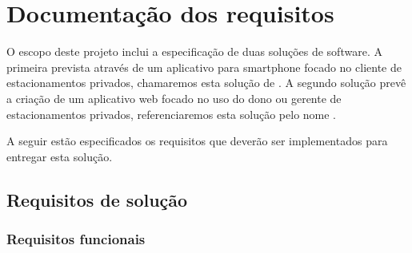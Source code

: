 \section{Documentação dos requisitos}

O escopo deste projeto inclui a especificação de duas soluções de software. A primeira prevista através de um aplicativo para smartphone focado no cliente de estacionamentos privados, chamaremos esta solução de \userMobileAppName{}. A segundo solução prevê a criação de um aplicativo web focado no uso do dono ou gerente de estacionamentos privados, referenciaremos esta solução pelo nome \parkingWebAppName{}.

A seguir estão especificados os requisitos que deverão ser implementados para entregar esta solução.

\subsection{Requisitos de solução}

\subsubsection{Requisitos funcionais}

